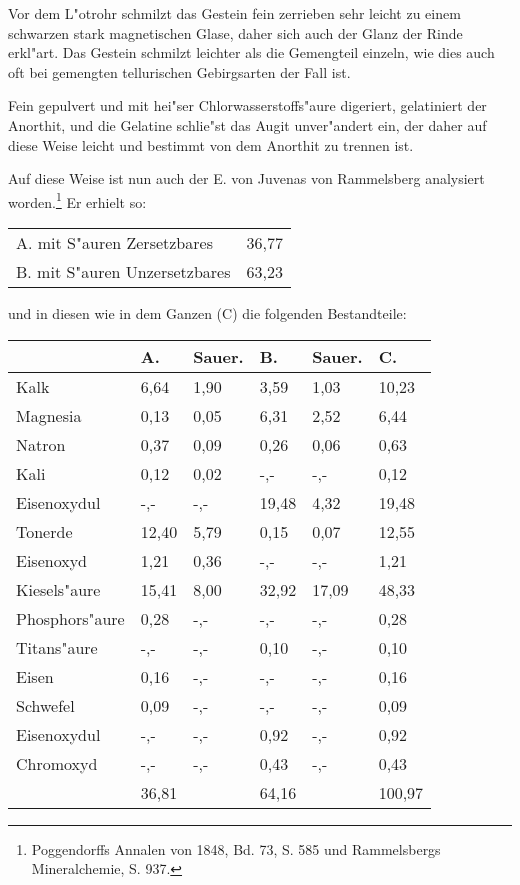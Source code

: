 \documentclass[a4paper, 11pt, oneside, german]{article}
\begin{document}
Vor dem L"otrohr schmilzt das Gestein fein zerrieben sehr leicht zu einem schwarzen stark magnetischen Glase, daher sich auch der Glanz der Rinde erkl"art. Das Gestein schmilzt leichter als die Gemengteil einzeln, wie dies auch oft bei gemengten tellurischen Gebirgsarten der Fall ist.

Fein gepulvert und mit hei"ser Chlorwasserstoffs"aure digeriert, gelatiniert der Anorthit, und die Gelatine schlie"st das Augit unver"andert ein, der daher auf diese Weise leicht und bestimmt von dem Anorthit zu trennen ist.

Auf diese Weise ist nun auch der E. von Juvenas von Rammelsberg analysiert worden.\footnote{Poggendorffs Annalen von 1848, Bd. 73, S. 585 und Rammelsbergs Mineralchemie, S. 937.} Er erhielt so:
\begin{center}
\begin{tabular}{ l r }
    A. mit S"auren Zersetzbares & 36,77\\
    B. mit S"auren Unzersetzbares & 63,23\\
\end{tabular}
\end{center}
und in diesen wie in dem Ganzen (C) die folgenden Bestandteile:
\begin{center}
\end{center}
\begin{center}
\begin{tabular}{ |p{23mm}|p{12mm}|p{8mm}|p{13mm}|p{8mm}|p{11mm}| }
    \hline
     & A. & Sauer. & B. & Sauer. & C.\\
    \hline\hline
    Kalk & 6,64 & 1,90 & 3,59 & 1,03 & 10,23\\\hline
    Magnesia & 0,13 & 0,05 & 6,31 & 2,52 & 6,44\\\hline
    Natron & 0,37 & 0,09 & 0,26 & 0,06 & 0,63\\\hline
    Kali & 0,12 & 0,02 & -,- & -,- & 0,12\\\hline
    Eisenoxydul & -,- & -,- & 19,48 & 4,32 & 19,48\\\hline
    Tonerde & 12,40 & 5,79 & 0,15 & 0,07 & 12,55\\\hline
    Eisenoxyd & 1,21 & 0,36 & -,- & -,- & 1,21\\\hline
    Kiesels"aure & 15,41 & 8,00 & 32,92 & 17,09 & 48,33\\\hline
    Phosphors"aure & 0,28 & -,- & -,- & -,- & 0,28\\\hline
    Titans"aure & -,- & -,- & 0,10 & -,- & 0,10\\\hline
    Eisen & 0,16 & -,- & -,- & -,- & 0,16\\\hline
    Schwefel & 0,09 & -,- & -,- & -,- & 0,09\\\hline
    Eisenoxydul & -,- & -,- & 0,92 & -,- & 0,92\\\hline
    Chromoxyd & -,- & -,- & 0,43 & -,- & 0,43\\\hline
     & 36,81 & & 64,16 & & 100,97\\
    \hline
\end{tabular}
\end{center}
\end{document}
